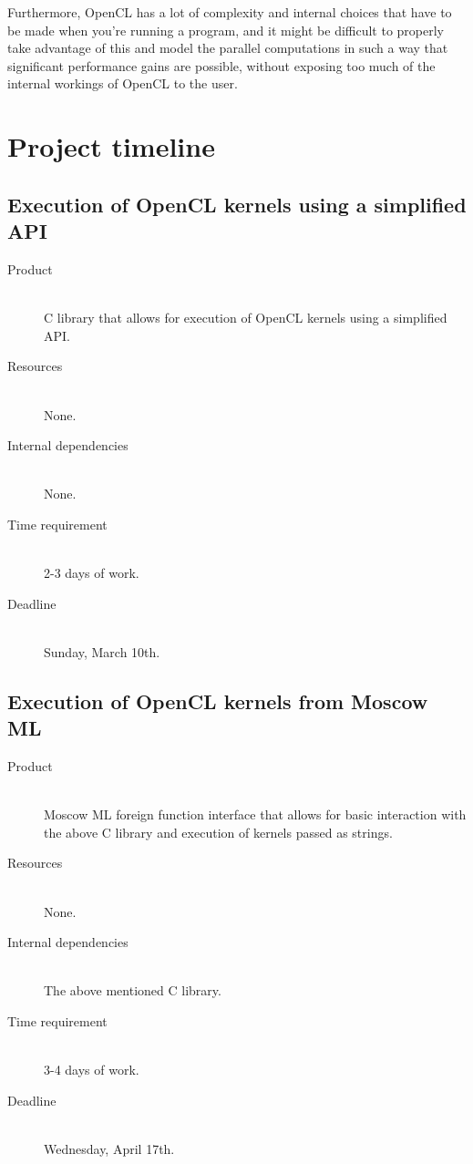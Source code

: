 \documentclass[a4paper, 10pt]{article}
\begin{document}
Furthermore, OpenCL has a lot of complexity and internal choices that
have to be made when you're running a program, and it might be
difficult to properly take advantage of this and model the parallel
computations in such a way that significant performance gains are
possible, without exposing too much of the internal workings of OpenCL
to the user.


\section{Project timeline}

\subsection{Execution of OpenCL kernels using a simplified API}
\label{sec:clibrary}

\begin{description}
  \item[Product] \hfill \\
    C library that allows for execution of OpenCL kernels using a
    simplified API.
  \item[Resources] \hfill \\
    None.
  \item[Internal dependencies] \hfill \\
    None.
  \item[Time requirement] \hfill \\
    2-3 days of work.
  \item[Deadline] \hfill \\
    Sunday, March 10th.
\end{description}

\subsection{Execution of OpenCL kernels from Moscow ML}
\label{sec:mosmlffi}

\begin{description}
  \item[Product] \hfill \\
    Moscow ML foreign function interface that allows for basic
    interaction with the above C library and execution of kernels
    passed as strings.
  \item[Resources] \hfill \\
    None.
  \item[Internal dependencies] \hfill \\
    The above mentioned C library.
  \item[Time requirement] \hfill \\
    3-4 days of work.
  \item[Deadline] \hfill \\
    Wednesday, April 17th.
\end{description}
\end{document}
